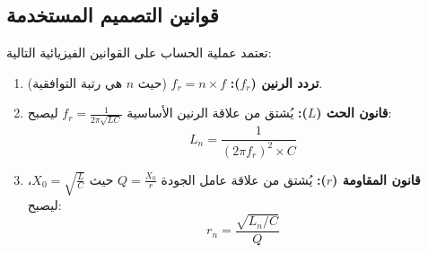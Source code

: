 
\subsection{قوانين التصميم المستخدمة}
تعتمد عملية الحساب على القوانين الفيزيائية التالية:
\begin{enumerate}
    \item \textbf{تردد الرنين ($f_r$):} $f_r = n \times f$ (حيث $n$ هي رتبة التوافقية).
    \item \textbf{قانون الحث ($L$):} يُشتق من علاقة الرنين الأساسية $f_r = \frac{1}{2 \pi \sqrt{LC}}$ ليصبح:
    \begin{equation*}
        L_n = \frac{1}{(2 \pi f_r)^2 \times C}
    \end{equation*}
    \item \textbf{قانون المقاومة ($r$):} يُشتق من علاقة عامل الجودة $Q = \frac{X_0}{r}$ حيث $X_0 = \sqrt{\frac{L}{C}}$، ليصبح:
    \begin{equation*}
        r_n = \frac{\sqrt{L_n / C}}{Q}
    \end{equation*}
\end{enumerate}
